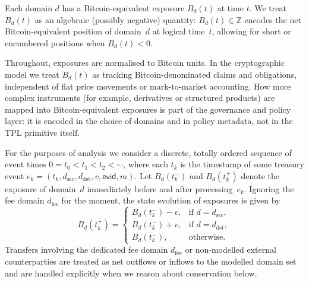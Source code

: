 \documentclass[11pt]{article}
\begin{document}
Each domain $d$ has a Bitcoin-equivalent exposure $B_d(t)$ at time $t$.
We treat $B_d(t)$ as an algebraic (possibly negative) quantity: $B_d(t) \in \mathbb{Z}$ encodes the net Bitcoin-equivalent
position of domain~$d$ at logical time~$t$, allowing for short or encumbered positions when $B_d(t) < 0$.

Throughout, exposures are normalised to Bitcoin units. In the cryptographic model we treat $B_d(t)$ as tracking Bitcoin-denominated claims and obligations, independent of fiat price movements or mark-to-market accounting. How more complex instruments (for example, derivatives or structured products) are mapped into Bitcoin-equivalent exposures is part of the governance and policy layer: it is encoded in the choice of domains and in policy metadata, not in the TPL primitive itself.

For the purposes of analysis we consider a discrete, totally ordered sequence of event times
$0 = t_0 < t_1 < t_2 < \cdots$, where each $t_k$ is the timestamp of some treasury event
$e_k = (t_k,d_{\mathrm{src}},d_{\mathrm{dst}},v,\mathsf{evid},m)$.
Let $B_d(t_k^-)$ and $B_d(t_k^+)$ denote the exposure of domain~$d$ immediately before and after processing~$e_k$.
Ignoring the fee domain $d_{\mathrm{fee}}$ for the moment, the state evolution of exposures is given by
\begin{equation}
\label{eq:balance-update}
  B_d(t_k^+) =
  \begin{cases}
    B_d(t_k^-) - v, & \text{if } d = d_{\mathrm{src}},\\
    B_d(t_k^-) + v, & \text{if } d = d_{\mathrm{dst}},\\
    B_d(t_k^-),     & \text{otherwise.}
  \end{cases}
\end{equation}
Transfers involving the dedicated fee domain $d_{\mathrm{fee}}$ or non-modelled external counterparties are treated as
net outflows or inflows to the modelled domain set and are handled explicitly when we reason about conservation below.
\end{document}
